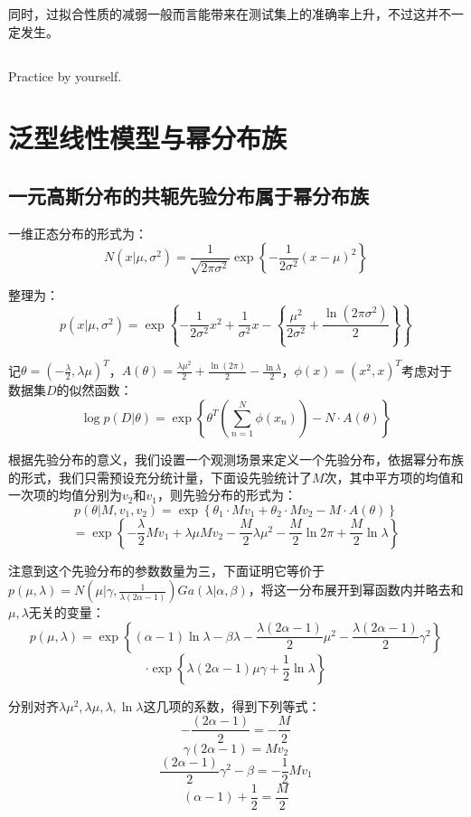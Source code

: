 \documentclass[UTF8]{ctexart}
\begin{document}
同时，过拟合性质的减弱一般而言能带来在测试集上的准确率上升，不过这并不一定发生。

\subsection{}
Practice by yourself.

\newpage
\section{泛型线性模型与幂分布族}
\subsection{一元高斯分布的共轭先验分布属于幂分布族}
一维正态分布的形式为：
$$N(x|\mu,\sigma^{2})=\frac{1}{\sqrt{2\pi \sigma^{2}}}\exp\left\{-\frac{1}{2\sigma^{2}}(x-\mu)^{2} \right\}$$

整理为：
$$p(x|\mu,\sigma^{2})=\exp\left\{-\frac{1}{2\sigma^{2}}x^{2} + \frac{1}{\sigma^{2}}x -\left\{\frac{\mu^{2}}{2\sigma^{2}}+\frac{\ln(2\pi\sigma^{2})}{2}\right\}  \right\}$$

记$\theta = (-\frac{\lambda}{2},\lambda\mu)^{T}$，$A(\theta) =\frac{\lambda\mu^{2}}{2}+\frac{\ln(2\pi)}{2}-\frac{\ln \lambda}{2}$，$\phi(x)=(x^{2},x)^{T}$考虑对于数据集$D$的似然函数：
$$\log p(D|\theta) = \exp\left\{ \theta^{T}(\sum_{n=1}^{N}\phi(x_{n})) -N\cdot A(\theta) \right\}$$

根据先验分布的意义，我们设置一个观测场景来定义一个先验分布，依据幂分布族的形式，我们只需预设充分统计量，下面设先验统计了$M$次，其中平方项的均值和一次项的均值分别为$v_{2}$和$v_{1}$，则先验分布的形式为：
$$p(\theta|M,v_{1},v_{2})=\exp\left\{ \theta_{1}\cdot Mv_{1} + \theta_{2}\cdot Mv_{2} - M\cdot A(\theta) \right\}$$
$$=\exp\left\{-\frac{\lambda}{2}Mv_{1}+\lambda\mu Mv_{2} - \frac{M}{2}\lambda\mu^{2}-\frac{M}{2}\ln 2\pi + \frac{M}{2}\ln \lambda  \right\}$$

注意到这个先验分布的参数数量为三，下面证明它等价于$p(\mu,\lambda)=N(\mu|\gamma,\frac{1}{\lambda(2\alpha-1)})Ga(\lambda|\alpha,\beta)$，将这一分布展开到幂函数内并略去和$\mu,\lambda$无关的变量：
$$p(\mu,\lambda)=\exp\left\{ (\alpha-1)\ln \lambda - \beta\lambda -\frac{\lambda(2\alpha-1)}{2}\mu^{2}-\frac{\lambda(2\alpha-1)}{2}\gamma^{2}\right\}$$
$$\cdot\exp\left\{\lambda(2\alpha-1)\mu\gamma+\frac{1}{2}\ln \lambda \right\}$$

分别对齐$\lambda \mu^{2},\lambda \mu,\lambda,\ln \lambda$这几项的系数，得到下列等式：
$$-\frac{(2\alpha-1)}{2} = -\frac{M}{2}$$
$$\gamma(2\alpha-1)=Mv_{2}$$
$$\frac{(2\alpha-1)}{2}\gamma^{2}-\beta=-\frac{1}{2}Mv_{1}$$
$$(\alpha-1)+\frac{1}{2}=\frac{M}{2}$$
\end{document}
